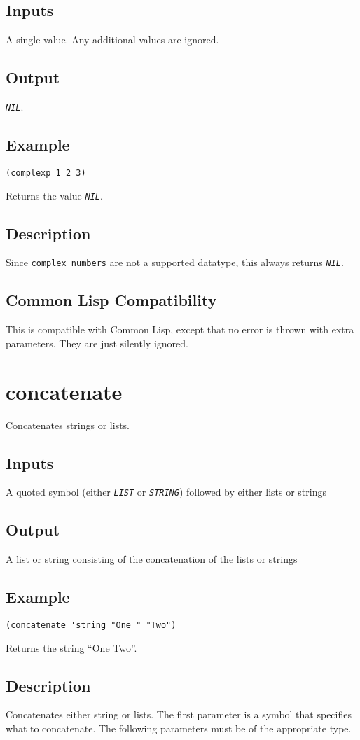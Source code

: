 \documentclass[10pt, openany]{book}
\newcommand{\constant}[1]{\emph{\texttt{#1}}}
\newcommand{\datatype}[1]{\texttt{#1}}
\newcommand{\cl}{Common Lisp}
\begin{document}
\subsection{Inputs}
A single value.  Any additional values are ignored.
\subsection{Output}
\constant{NIL}.
\subsection{Example}
\begin{lstlisting}
(complexp 1 2 3)
\end{lstlisting}
Returns the value \constant{NIL}.
\subsection{Description}
Since \datatype{complex numbers} are not a supported datatype, this always returns \constant{NIL}.
\subsection{Common Lisp Compatibility}
This is compatible with \cl, except that no error is thrown with extra parameters.  They are just silently ignored.

\section{concatenate}
Concatenates strings or lists.
\subsection{Inputs}
A quoted symbol (either \constant{LIST} or \constant{STRING}) followed by either lists or strings
\subsection{Output}
A list or string consisting of the concatenation of the lists or strings
\subsection{Example}
\begin{lstlisting}
(concatenate 'string "One " "Two")
\end{lstlisting}
Returns the string ``One Two''.
\subsection{Description}
Concatenates either string or lists.  The first parameter is a symbol that specifies what to concatenate.  The following parameters must be of the appropriate type.
\end{document}
